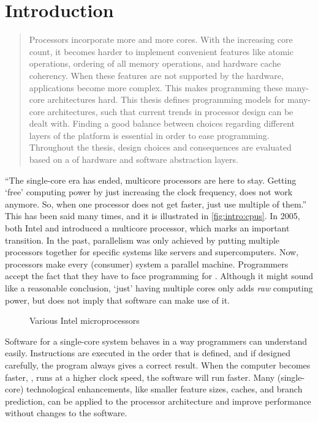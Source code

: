 \chapter{Introduction}
\label{c:introduction}

\begin{abstract}%
Processors incorporate more and more cores.
With the increasing core count, it becomes harder to implement convenient features like atomic operations, ordering of all memory operations, and hardware cache coherency.
When these features are not supported by the hardware, applications become more complex.
This makes programming these many-core architectures hard.
This thesis defines programming models for many-core architectures, such that current trends in processor design can be dealt with.
Finding a good balance between choices regarding different layers of the platform is essential in order to ease programming.
Throughout the thesis, design choices and consequences are evaluated based on a \codesign of hardware and software abstraction layers.
\end{abstract}

``The single-core era has ended, multicore processors are here to stay.
Getting `free' computing power by just increasing the clock frequency, does not work anymore.
So, when one processor does not get faster, just use multiple of them.''
This has been said many times, and it is illustrated in \vref{fig:intro:cpus}.
In 2005, both Intel and  introduced a multicore processor, which marks an important transition.
In the past, parallelism was only achieved by putting multiple processors together for specific systems like servers and supercomputers.
Now, processors make every (consumer) system a parallel machine.
Programmers accept the fact that they have to face programming for .
Although it might sound like a reasonable conclusion, `just' having multiple cores only adds \emph{raw} computing power, but does not imply that software can make use of it.

\begin{figure}%
%
\caption{Various Intel microprocessors}%
\label{fig:intro:cpus}%
\end{figure}

Software for a single-core system behaves in a way programmers can understand easily.
Instructions are executed in the order that is defined, and if designed carefully, the program always gives a correct result.
When the computer becomes faster, \eg, runs at a higher clock speed, the software will run faster.
Many (single-core) technological enhancements, like smaller feature sizes, caches, and branch prediction, can be applied to the processor architecture and improve performance without changes to the software.

